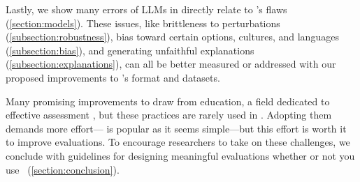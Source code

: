 Lastly, we show many errors of LLMs in \mcqa directly relate to
\mcqa's flaws (\cref{section:models}).
%
These issues, like brittleness to perturbations
(\cref{subsection:robustness}), bias toward certain options, cultures,
and languages (\cref{subsection:bias}), and generating
unfaithful explanations (\cref{subsection:explanations}), can all be
better measured or addressed with our proposed improvements to \mcqa's
format and datasets.


Many promising improvements to \mcqa draw from education, a field dedicated to effective assessment
\cite{haladyna2002review}, but these practices are rarely used in .
Adopting them demands more effort---\mcqa{} is popular
as it seems simple---but this effort is worth it to improve
evaluations.
%
To encourage researchers to take on these challenges, we conclude with
guidelines for designing meaningful evaluations whether or not you use
\mcqa{}~(\cref{section:conclusion}).

